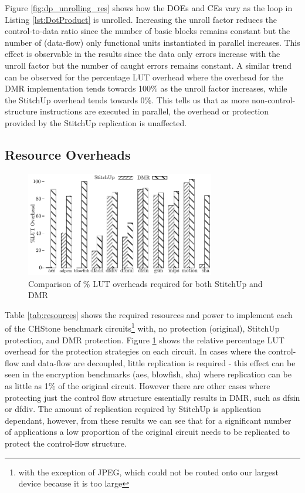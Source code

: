 Figure \ref{fig:dp_unrolling_res} shows how the DOEs and CEs vary as the loop in Listing \ref{lst:DotProduct}
is unrolled.
Increasing the unroll factor reduces the control-to-data ratio since the number of basic blocks remains constant but the number of (data-flow)
only functional units instantiated in parallel increases.
This effect is observable in the results since the data only errors increase with the unroll factor but the number of caught errors
remains constant.
A similar trend can be observed for the percentage LUT overhead where the overhead for the DMR implementation
tends towards 100\% as the unroll factor increases, while the StitchUp overhead tends towards 0\%.
This tells us that as more non-control-structure instructions are executed in parallel, the overhead or
protection provided by the StitchUp replication is unaffected.

\subsection{Resource Overheads}
\renewcommand{\arraystretch}{0.8}

\begin{figure}[t]
\centering
\includegraphics[width=3.25in]{./graphs/luts_res.pdf}
\caption{Comparison of \% LUT overheads required for both StitchUp and DMR}
\label{fig:lut_res}
\end{figure}

Table \ref{tab:resources} shows the required resources and power to implement
each of the CHStone benchmark circuits\footnote{with the exception of JPEG, which could not be routed onto our largest device because it is too large}
with, no protection (original), StitchUp protection, and DMR protection.
Figure \ref{fig:lut_res} shows the relative percentage LUT overhead for the protection strategies on each circuit.
In cases where the control-flow and data-flow are decoupled, little replication is required - this effect can be seen in
the encryption benchmarks (aes, blowfish, sha) where replication can be as little as 1\% of the original circuit.
However there are other cases where protecting just the control flow structure essentially results in DMR, such as dfsin or dfdiv.
The amount of replication required by StitchUp is application dependant, however, from these results we can see
that for a significant number of applications a low proportion of the original circuit needs to be replicated to
protect the control-flow structure.

